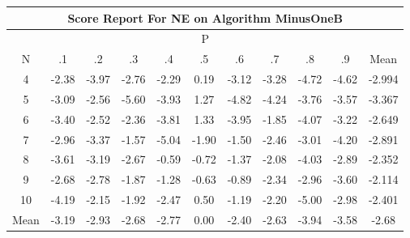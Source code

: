\documentclass[11pt,a4paper]{report}
\begin{document}
\begin{longtable}{ | c || c | c | c | c | c | c | c | c | c || c |}
\hline
\multicolumn{11}{|c|}{ Score Report For NE on Algorithm MinusOneB} \\
\hline
\multicolumn{11}{|c|}{ P } \\
\hline
N & .1 & .2 & .3 & .4 & .5 & .6 & .7 & .8 & .9 & Mean\\
 \hline
 \hline
 \endhead
  4 &  \cellcolor[HTML]{FFBFBF} -2.38 &  \cellcolor[HTML]{FF9F9F} -3.97 &  \cellcolor[HTML]{FFB7B7} -2.76 &  \cellcolor[HTML]{FFC7C7} -2.29 &  \cellcolor[HTML]{F7F7FF} 0.19 &  \cellcolor[HTML]{FFAFAF} -3.12 &  \cellcolor[HTML]{FFAFAF} -3.28 &  \cellcolor[HTML]{FF8787} -4.72 &  \cellcolor[HTML]{FF8787} -4.62 & -2.994 \\
  5 &  \cellcolor[HTML]{FFAFAF} -3.09 &  \cellcolor[HTML]{FFBFBF} -2.56 &  \cellcolor[HTML]{FF7070} -5.60 &  \cellcolor[HTML]{FF9F9F} -3.93 &  \cellcolor[HTML]{DFDFFF} 1.27 &  \cellcolor[HTML]{FF8787} -4.82 &  \cellcolor[HTML]{FF9797} -4.24 &  \cellcolor[HTML]{FF9F9F} -3.76 &  \cellcolor[HTML]{FFA7A7} -3.57 & -3.367 \\
  6 &  \cellcolor[HTML]{FFA7A7} -3.40 &  \cellcolor[HTML]{FFBFBF} -2.52 &  \cellcolor[HTML]{FFC7C7} -2.36 &  \cellcolor[HTML]{FF9F9F} -3.81 &  \cellcolor[HTML]{DFDFFF} 1.33 &  \cellcolor[HTML]{FF9F9F} -3.95 &  \cellcolor[HTML]{FFCFCF} -1.85 &  \cellcolor[HTML]{FF9797} -4.07 &  \cellcolor[HTML]{FFAFAF} -3.22 & -2.649 \\
  7 &  \cellcolor[HTML]{FFB7B7} -2.96 &  \cellcolor[HTML]{FFA7A7} -3.37 &  \cellcolor[HTML]{FFD7D7} -1.57 &  \cellcolor[HTML]{FF8080} -5.04 &  \cellcolor[HTML]{FFCFCF} -1.90 &  \cellcolor[HTML]{FFD7D7} -1.50 &  \cellcolor[HTML]{FFBFBF} -2.46 &  \cellcolor[HTML]{FFB7B7} -3.01 &  \cellcolor[HTML]{FF9797} -4.20 & -2.891 \\
  8 &  \cellcolor[HTML]{FFA7A7} -3.61 &  \cellcolor[HTML]{FFAFAF} -3.19 &  \cellcolor[HTML]{FFBFBF} -2.67 &  \cellcolor[HTML]{FFEFEF} -0.59 &  \cellcolor[HTML]{FFEFEF} -0.72 &  \cellcolor[HTML]{FFDFDF} -1.37 &  \cellcolor[HTML]{FFC7C7} -2.08 &  \cellcolor[HTML]{FF9797} -4.03 &  \cellcolor[HTML]{FFB7B7} -2.89 & -2.352 \\
  9 &  \cellcolor[HTML]{FFBFBF} -2.68 &  \cellcolor[HTML]{FFB7B7} -2.78 &  \cellcolor[HTML]{FFCFCF} -1.87 &  \cellcolor[HTML]{FFDFDF} -1.28 &  \cellcolor[HTML]{FFEFEF} -0.63 &  \cellcolor[HTML]{FFE7E7} -0.89 &  \cellcolor[HTML]{FFC7C7} -2.34 &  \cellcolor[HTML]{FFB7B7} -2.96 &  \cellcolor[HTML]{FFA7A7} -3.60 & -2.114 \\
  10 &  \cellcolor[HTML]{FF9797} -4.19 &  \cellcolor[HTML]{FFC7C7} -2.15 &  \cellcolor[HTML]{FFCFCF} -1.92 &  \cellcolor[HTML]{FFBFBF} -2.47 &  \cellcolor[HTML]{EFEFFF} 0.50 &  \cellcolor[HTML]{FFDFDF} -1.19 &  \cellcolor[HTML]{FFC7C7} -2.20 &  \cellcolor[HTML]{FF8080} -5.00 &  \cellcolor[HTML]{FFB7B7} -2.98 & -2.401 \\
 \hline
 \hline
Mean &  \cellcolor[HTML]{FFAFAF} -3.19 &  \cellcolor[HTML]{FFB7B7} -2.93 &  \cellcolor[HTML]{FFBFBF} -2.68 &  \cellcolor[HTML]{FFB7B7} -2.77 &  \cellcolor[HTML]{FFFFFF} 0.00 &  \cellcolor[HTML]{FFBFBF} -2.40 &  \cellcolor[HTML]{FFBFBF} -2.63 &  \cellcolor[HTML]{FF9F9F} -3.94 &  \cellcolor[HTML]{FFA7A7} -3.58 &  \cellcolor[HTML]{FFBFBF} -2.68
\end{longtable}
\end{document}
